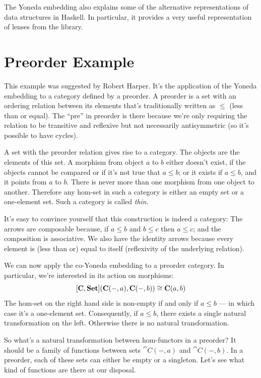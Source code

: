 The Yoneda embedding also explains some of the alternative
representations of data structures in Haskell. In particular, it
provides a 
{very useful representation}
of lenses from the  library.

\section{Preorder Example}

This example was suggested by Robert Harper. It's the application of the
Yoneda embedding to a category defined by a preorder. A preorder is a
set with an ordering relation between its elements that's traditionally
written as $\leqslant$ (less than or equal). The ``pre'' in
preorder is there because we're only requiring the relation to be
transitive and reflexive but not necessarily antisymmetric (so it's
possible to have cycles).

A set with the preorder relation gives rise to a category. The objects
are the elements of this set. A morphism from object $a$ to
$b$ either doesn't exist, if the objects cannot be compared or if
it's not true that $a \leqslant b$; or it exists if
$a \leqslant b$, and it points from $a$ to
$b$. There is never more than one morphism from one object to
another. Therefore any hom-set in such a category is either an empty set
or a one-element set. Such a category is called \emph{thin}.

It's easy to convince yourself that this construction is indeed a
category: The arrows are composable because, if
$a \leqslant b$ and $b \leqslant c$ then
$a \leqslant c$; and the composition is associative. We also
have the identity arrows because every element is (less than or) equal
to itself (reflexivity of the underlying relation).

We can now apply the co-Yoneda embedding to a preorder category. In
particular, we're interested in its action on morphisms:
\[[\mathbf{C}, \mathbf{Set}](\mathbf{C}(-, a), \mathbf{C}(-, b)) \cong \mathbf{C}(a, b)\]
The hom-set on the right hand side is non-empty if and only if
$a \leqslant b$ --- in which case it's a one-element set.
Consequently, if $a \leqslant b$, there exists a single
natural transformation on the left. Otherwise there is no natural
transformation.

So what's a natural transformation between hom-functors in a preorder?
It should be a family of functions between sets $\cat{C}(-, a)$ and
$\cat{C}(-, b)$. In a preorder, each of these sets can either be empty
or a singleton. Let's see what kind of functions are there at our
disposal.

